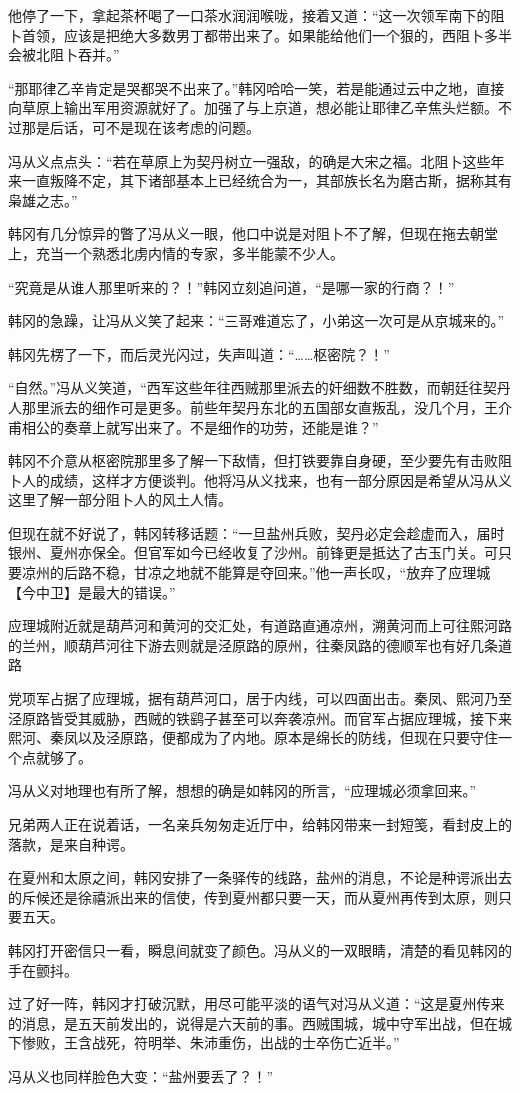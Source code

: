 他停了一下，拿起茶杯喝了一口茶水润润喉咙，接着又道：“这一次领军南下的阻卜首领，应该是把绝大多数男丁都带出来了。如果能给他们一个狠的，西阻卜多半会被北阻卜吞并。”

“那耶律乙辛肯定是哭都哭不出来了。”韩冈哈哈一笑，若是能通过云中之地，直接向草原上输出军用资源就好了。加强了与上京道，想必能让耶律乙辛焦头烂额。不过那是后话，可不是现在该考虑的问题。

冯从义点点头：“若在草原上为契丹树立一强敌，的确是大宋之福。北阻卜这些年来一直叛降不定，其下诸部基本上已经统合为一，其部族长名为磨古斯，据称其有枭雄之志。”

韩冈有几分惊异的瞥了冯从义一眼，他口中说是对阻卜不了解，但现在拖去朝堂上，充当一个熟悉北虏内情的专家，多半能蒙不少人。

“究竟是从谁人那里听来的？！”韩冈立刻追问道，“是哪一家的行商？！”

韩冈的急躁，让冯从义笑了起来：“三哥难道忘了，小弟这一次可是从京城来的。”

韩冈先楞了一下，而后灵光闪过，失声叫道：“……枢密院？！”

“自然。”冯从义笑道，“西军这些年往西贼那里派去的奸细数不胜数，而朝廷往契丹人那里派去的细作可是更多。前些年契丹东北的五国部女直叛乱，没几个月，王介甫相公的奏章上就写出来了。不是细作的功劳，还能是谁？”

韩冈不介意从枢密院那里多了解一下敌情，但打铁要靠自身硬，至少要先有击败阻卜人的成绩，这样才方便谈判。他将冯从义找来，也有一部分原因是希望从冯从义这里了解一部分阻卜人的风土人情。

但现在就不好说了，韩冈转移话题：“一旦盐州兵败，契丹必定会趁虚而入，届时银州、夏州亦保全。但官军如今已经收复了沙州。前锋更是抵达了古玉门关。可只要凉州的后路不稳，甘凉之地就不能算是夺回来。”他一声长叹，“放弃了应理城【今中卫】是最大的错误。”

应理城附近就是葫芦河和黄河的交汇处，有道路直通凉州，溯黄河而上可往熙河路的兰州，顺葫芦河往下游去则就是泾原路的原州，往秦凤路的德顺军也有好几条道路

党项军占据了应理城，据有葫芦河口，居于内线，可以四面出击。秦凤、熙河乃至泾原路皆受其威胁，西贼的铁鹞子甚至可以奔袭凉州。而官军占据应理城，接下来熙河、秦凤以及泾原路，便都成为了内地。原本是绵长的防线，但现在只要守住一个点就够了。

冯从义对地理也有所了解，想想的确是如韩冈的所言，“应理城必须拿回来。”

兄弟两人正在说着话，一名亲兵匆匆走近厅中，给韩冈带来一封短笺，看封皮上的落款，是来自种谔。

在夏州和太原之间，韩冈安排了一条驿传的线路，盐州的消息，不论是种谔派出去的斥候还是徐禧派出来的信使，传到夏州都只要一天，而从夏州再传到太原，则只要五天。

韩冈打开密信只一看，瞬息间就变了颜色。冯从义的一双眼睛，清楚的看见韩冈的手在颤抖。

过了好一阵，韩冈才打破沉默，用尽可能平淡的语气对冯从义道：“这是夏州传来的消息，是五天前发出的，说得是六天前的事。西贼围城，城中守军出战，但在城下惨败，王含战死，符明举、朱沛重伤，出战的士卒伤亡近半。”

冯从义也同样脸色大变：“盐州要丢了？！”

